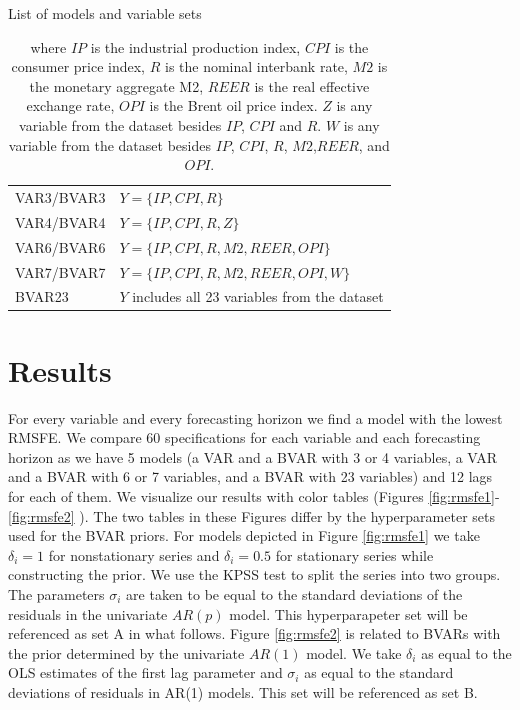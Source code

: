\documentclass[12pt]{article} %
\begin{document}
\begin{table}
\begin{center}
\caption{List of models and variable sets}
\begin{tabular}{p{2.5cm}l}
\toprule
VAR3/BVAR3&$Y=\lbrace IP, CPI, R \rbrace$\\
VAR4/BVAR4 &$Y=\lbrace IP, CPI, R, Z\rbrace$ \\
VAR6/BVAR6& $Y=\lbrace IP, CPI, R, M2, REER, OPI \rbrace$ \\
VAR7/BVAR7&$Y=\lbrace IP, CPI, R, M2, REER, OPI, W \rbrace$\\
BVAR23&$Y$ includes all 23 variables from the dataset\\
\bottomrule
\end{tabular}
\vspace{5mm}
\caption*{where $IP$ is the industrial production index, $CPI$ is the consumer price index, $R$ is the nominal interbank rate, $M2$ is the monetary aggregate M2, $REER$ is the real effective exchange rate, $OPI$ is the Brent oil price index. $Z$ is any variable from the dataset besides $IP$, $CPI$ and $R$.  $W$ is any variable from the dataset besides $IP$, $CPI$, $R$, $M2$,$REER$, and $OPI$.}
\label{tab:models}
\end{center}
\end{table}

\section{Results}

For every variable and every forecasting horizon we find a model with the lowest RMSFE. We compare 60 specifications for each variable and each forecasting horizon as we have 5 models (a VAR and a BVAR with 3 or 4 variables, a VAR and a BVAR with 6 or 7 variables, and a BVAR with 23 variables) and 12 lags for each of them.
We visualize our results with color tables (Figures \ref{fig:rmsfe1}-\ref{fig:rmsfe2} ).
The two tables in these Figures differ by the hyperparameter sets used for the BVAR priors. For models depicted in Figure \ref{fig:rmsfe1}  we take $\delta_i =1$ for nonstationary series and $\delta_i =0.5$ for stationary series while constructing the prior. We use the KPSS test to split the series into two groups. The parameters $\sigma_i$ are taken to be equal to the standard deviations of the residuals in the univariate $AR(p)$ model. This hyperparapeter set will be referenced as set A in what follows. Figure \ref{fig:rmsfe2} is related to BVARs with the prior determined by the univariate $AR(1)$ model. We take $\delta_i$ as equal to the OLS estimates of the first lag parameter and  $\sigma_i$ as equal to the standard deviations of residuals in AR(1) models. This set will be referenced as set B.
\end{document}
